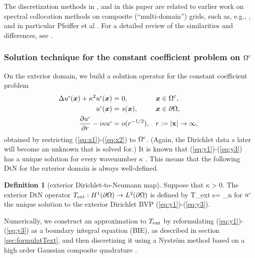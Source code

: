 \documentclass[11pt,final]{amsart}
\theoremstyle{definition}
\numberwithin{remark}{section}
\newtheorem{definition}{Definition}
\numberwithin{definition}{section}
\numberwithin{pro}{section}
\begin{document}
The discretization methods in \cite{ONspectralcomposite,2012_martinsson_spectralcomposite},
and in this paper are related to earlier work on spectral collocation methods on composite
(``multi-domain'') grids, such as, e.g., \cite{1998_Kopriva,2000_Yang}, and in particular
Pfeiffer et al \cite{2003_pfeiffer}. For a detailed review of the similarities and differences,
see \cite{2012_martinsson_spectralcomposite}.

\subsubsection{Solution technique for the constant coefficient problem on $\Omega^{\rm c}$}
\label{sec:introext}
On the exterior domain, we build a solution operator for the constant coefficient problem
\begin{align}
\label{eq:y1}
\Delta u^{\mbox{\tiny s}}(\bm{x}) + \kappa^{2}u^{\mbox{\tiny s}}(\bm{x}) =&\ 0, &&\bm{x} \in \Omega^{\rm c},\\
\label{eq:y2}
u^{\mbox{\tiny s}}(\bm{x}) =&\ s(\bm{x}), && \bm{x} \in \partial \Omega,\\
\label{eq:y3}
\frac{\partial u^{\mbox{\tiny s}}}{\partial r} - i \kappa u^{\mbox{\tiny s}} =&\ o(r^{-1/2}), &&r:=|{\mathbf x}| \to \infty,
\end{align}
obtained by restricting (\ref{eq:x1})-(\ref{eq:x2}) to $\Omega^{\rm c}$.
(Again, the Dirichlet data $s$ later will become an unknown that is solved
for.)
It is known that (\ref{eq:y1})-(\ref{eq:y3})
has a unique solution for every wavenumber $\kappa$ \cite[Ch.~3]{coltonkress}.
This means that the following DtN
for the exterior domain is always well-defined.

\begin{definition}[exterior Dirichlet-to-Neumann map]
Suppose that $\kappa>0$. The exterior DtN operator $T_{\rm ext}:H^1({\partial\Omega})\to L^2({\partial\Omega})$ is defined by
\be
T_{\rm ext} s= \us_n
\label{Te}
\ee
for $u^{\mbox{\tiny s}}$ the unique solution to the exterior Dirichlet BVP (\ref{eq:y1})-(\ref{eq:y3}).
\end{definition}

Numerically, we construct an approximation to $T_{\rm ext}$ by reformulating (\ref{eq:y1})-(\ref{eq:y3})
as a boundary integral equation (BIE), as described in section \ref{sec:formulatText}, and then discretizing it using a Nystr\"om method based on a high order Gaussian composite quadrature \cite{gen_quad}.
\end{document}
